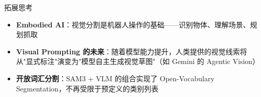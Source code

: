\documentclass[a4paper]{article}
\begin{document}
\begin{knowledgebox}{拓展思考}
\begin{itemize}
    \item \textbf{Embodied AI}：视觉分割是机器人操作的基础——识别物体、理解场景、规划抓取
    \item \textbf{Visual Prompting 的未来}：随着模型能力提升，人类提供的视觉线索将从"显式标注"演变为"模型自主生成视觉草图"（如 Gemini 的 Agentic Vision）
    \item \textbf{开放词汇分割}：SAM3 + VLM 的组合实现了 Open-Vocabulary Segmentation，不再受限于预定义的类别列表
\end{itemize}
\end{knowledgebox}

\end{document}
